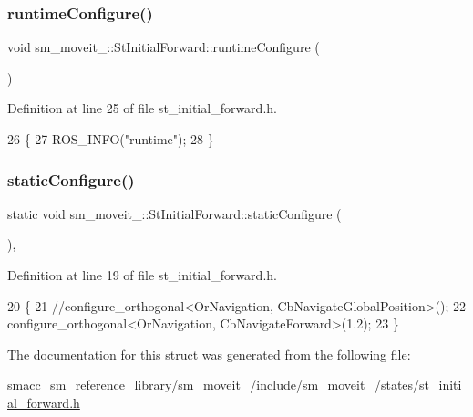 \subsubsection{\texorpdfstring{runtime\+Configure()}{runtimeConfigure()}}
{\footnotesize\ttfamily void sm\+\_\+moveit\+\_\+::\+St\+Initial\+Forward\+::runtime\+Configure (\begin{DoxyParamCaption}{ }\end{DoxyParamCaption})\hspace{0.3cm}{\ttfamily [inline]}}



Definition at line 25 of file st\+\_\+initial\+\_\+forward.\+h.


\begin{DoxyCode}
26     \{
27         ROS\_INFO(\textcolor{stringliteral}{"runtime"});
28     \}
\end{DoxyCode}
\mbox{\label{structsm__moveit__2_1_1StInitialForward_a6943e50ca4cd480b67f411944143ae3a}} 
\subsubsection{\texorpdfstring{static\+Configure()}{staticConfigure()}}
{\footnotesize\ttfamily static void sm\+\_\+moveit\+\_\+::\+St\+Initial\+Forward\+::static\+Configure (\begin{DoxyParamCaption}{ }\end{DoxyParamCaption})\hspace{0.3cm}{\ttfamily [inline]}, {\ttfamily [static]}}



Definition at line 19 of file st\+\_\+initial\+\_\+forward.\+h.


\begin{DoxyCode}
20     \{
21         \textcolor{comment}{//configure\_orthogonal<OrNavigation, CbNavigateGlobalPosition>();}
22         configure\_orthogonal<OrNavigation, CbNavigateForward>(1.2);
23     \}
\end{DoxyCode}


The documentation for this struct was generated from the following file\+:\begin{DoxyCompactItemize}
\item 
smacc\+\_\+sm\+\_\+reference\+\_\+library/sm\+\_\+moveit\+\_/include/sm\+\_\+moveit\+\_/states/\hyperlink{2_2include_2sm__moveit__2_2states_2st__initial__forward_8h}{st\+\_\+initial\+\_\+forward.\+h}\end{DoxyCompactItemize}
